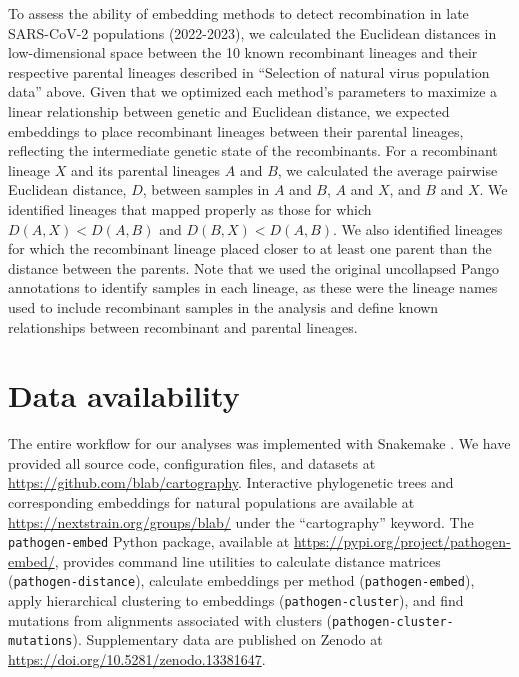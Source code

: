 \documentclass[webpdf,contemporary,large,single]{oup-authoring-template}%
\theoremstyle{thmstyleone}%
\theoremstyle{thmstyletwo}%
\theoremstyle{thmstylethree}%
\begin{document}
To assess the ability of embedding methods to detect recombination in late SARS-CoV-2 populations (2022-2023), we calculated the Euclidean distances in low-dimensional space between the 10 known recombinant lineages and their respective parental lineages described in ``Selection of natural virus population data'' above.
Given that we optimized each method's parameters to maximize a linear relationship between genetic and Euclidean distance, we expected embeddings to place recombinant lineages between their parental lineages, reflecting the intermediate genetic state of the recombinants.
For a recombinant lineage $X$ and its parental lineages $A$ and $B$, we calculated the average pairwise Euclidean distance, $D$, between samples in $A$ and $B$, $A$ and $X$, and $B$ and $X$.
We identified lineages that mapped properly as those for which $D(A, X) < D(A, B)$ and $D(B, X) < D(A, B)$.
We also identified lineages for which the recombinant lineage placed closer to at least one parent than the distance between the parents.
Note that we used the original uncollapsed Pango annotations to identify samples in each lineage, as these were the lineage names used to include recombinant samples in the analysis and define known relationships between recombinant and parental lineages.

\section*{Data availability}

The entire workflow for our analyses was implemented with Snakemake \citep{molder_2021}.
We have provided all source code, configuration files, and datasets at \href{https://github.com/blab/cartography}{https://github.com/blab/cartography}.
Interactive phylogenetic trees and corresponding embeddings for natural populations are available at \href{https://nextstrain.org/groups/blab/}{https://nextstrain.org/groups/blab/} under the ``cartography'' keyword.
The \texttt{pathogen-embed} Python package, available at \href{https://pypi.org/project/pathogen-embed/}{https://pypi.org/project/pathogen-embed/}, provides command line utilities to calculate distance matrices (\texttt{pathogen-distance}), calculate embeddings per method (\texttt{pathogen-embed}), apply hierarchical clustering to embeddings (\texttt{pathogen-cluster}), and find mutations from alignments associated with clusters (\texttt{pathogen-cluster-mutations}).
Supplementary data are published on Zenodo at \url{https://doi.org/10.5281/zenodo.13381647}.
\end{document}
